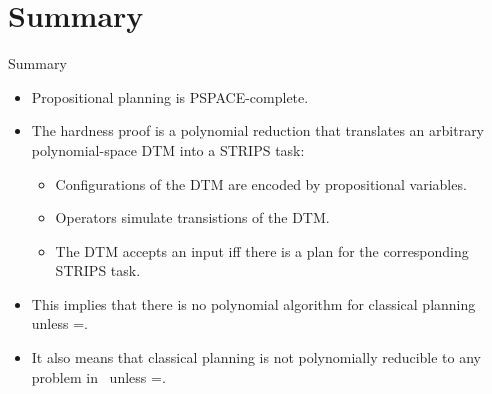 \documentclass{gkibeamer}
\begin{document}
\section*{Summary}
\begin{frame}{Summary}
  \begin{itemize}
    \item \alert{Propositional planning} is \alert{PSPACE-complete}.
    \item The hardness proof is a polynomial reduction that translates
        an \alert{arbitrary polynomial-space DTM} into a \alert{STRIPS task}:
        \begin{itemize}
            \item Configurations of the DTM are encoded by propositional
                variables.
            \item Operators simulate transistions of the DTM.
            \item The DTM accepts an input iff there is a plan for the
               corresponding STRIPS task.
        \end{itemize}
    \item This implies that there is \alert{no polynomial algorithm} for
        classical planning unless \ptime=\pspace.
    \item It also means that classical planning is not polynomially
        reducible to any problem in \np\ unless \np=\pspace.
  \end{itemize}
\end{frame}
\end{document}
